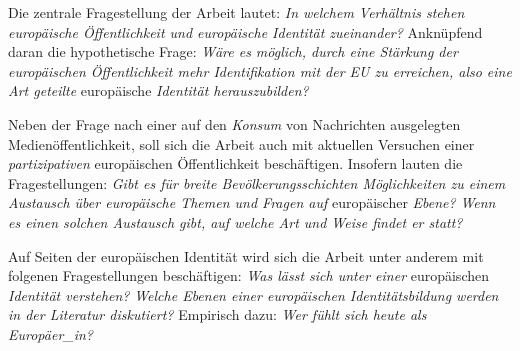 \documentclass[a4paper, german, oneside]{scrartcl}
\begin{document}
Die zentrale Fragestellung der Arbeit lautet: \emph{In welchem Verhältnis stehen europäische Öffentlichkeit und europäische Identität zueinander?} Anknüpfend daran die hypothetische Frage: \emph{Wäre es möglich, durch eine Stärkung der europäischen Öffentlichkeit mehr Identifikation mit der EU zu erreichen, also eine Art geteilte} europäische \emph{Identität herauszubilden?}



Neben der Frage nach einer auf den \emph{Konsum} von Nachrichten ausgelegten Medienöffentlichkeit, soll sich die Arbeit auch mit aktuellen Versuchen einer \emph{partizipativen} europäischen Öffentlichkeit beschäftigen. Insofern lauten die Fragestellungen: \emph{Gibt es für breite Bevölkerungsschichten Möglichkeiten zu einem Austausch über europäische Themen und Fragen auf} europäischer \emph{Ebene?} \emph{Wenn es einen solchen Austausch gibt, auf welche Art und Weise findet er statt?} 

Auf Seiten der europäischen Identität wird sich die Arbeit unter anderem mit folgenen Fragestellungen beschäftigen: \emph{Was lässt sich unter einer} europäischen \emph{Identität verstehen?} \emph{Welche Ebenen einer europäischen Identitätsbildung werden in der Literatur diskutiert?} Empirisch dazu: \emph{Wer fühlt sich heute als Europäer\_in?}




\end{document}
